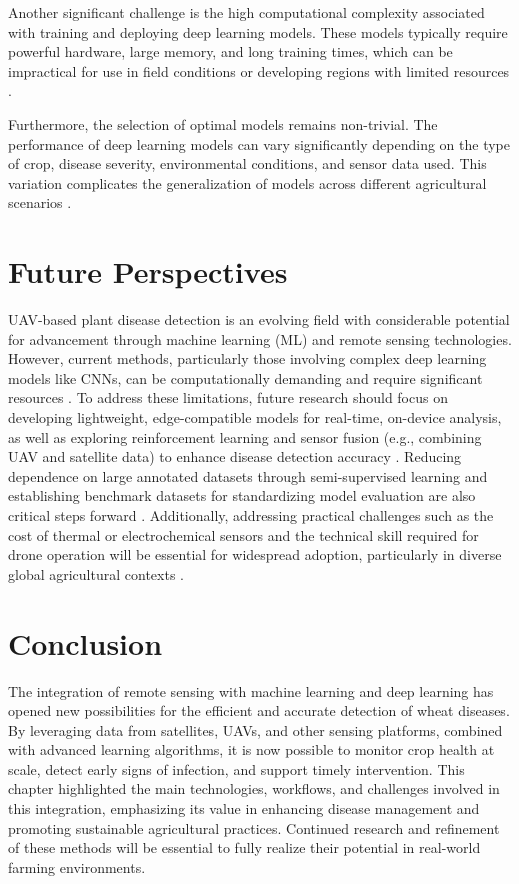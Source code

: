 Another significant challenge is the high computational complexity associated with training and deploying deep learning models. These models typically require powerful hardware, large memory, and long training times, which can be impractical for use in field conditions or developing regions with limited resources \parencite{shahi2023recent}.

Furthermore, the selection of optimal models remains non-trivial. The performance of deep learning models can vary significantly depending on the type of crop, disease severity, environmental conditions, and sensor data used. This variation complicates the generalization of models across different agricultural scenarios \parencite{shahi2023recent}.

\section{Future Perspectives}
UAV-based plant disease detection is an evolving field with considerable potential for advancement through machine learning (ML) and remote sensing technologies. However, current methods, particularly those involving complex deep learning models like CNNs, can be computationally demanding and require significant resources \parencite{Kouadio2023}. To address these limitations, future research should focus on developing lightweight, edge-compatible models for real-time, on-device analysis, as well as exploring reinforcement learning and sensor fusion (e.g., combining UAV and satellite data) to enhance disease detection accuracy \parencite{shahi2023recent,Kouadio2023}. Reducing dependence on large annotated datasets through semi-supervised learning and establishing benchmark datasets for standardizing model evaluation are also critical steps forward \parencite{shahi2023recent}. Additionally, addressing practical challenges such as the cost of thermal or electrochemical sensors and the technical skill required for drone operation will be essential for widespread adoption, particularly in diverse global agricultural contexts \parencite{Kouadio2023}.

\section{Conclusion}
The integration of remote sensing with machine learning and deep learning has opened new possibilities for the efficient and accurate detection of wheat diseases. By leveraging data from satellites, UAVs, and other sensing platforms, combined with advanced learning algorithms, it is now possible to monitor crop health at scale, detect early signs of infection, and support timely intervention. This chapter highlighted the main technologies, workflows, and challenges involved in this integration, emphasizing its value in enhancing disease management and promoting sustainable agricultural practices. Continued research and refinement of these methods will be essential to fully realize their potential in real-world farming environments.